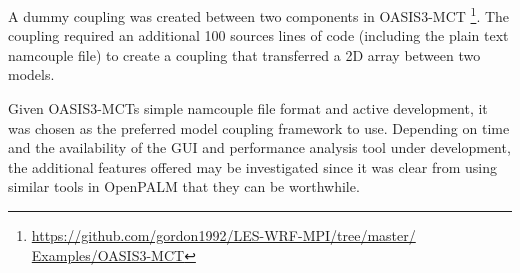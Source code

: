 A dummy coupling was created between two components in OASIS3-MCT
\footnote{\url{https://github.com/gordon1992/LES-WRF-MPI/tree/master/
Examples/OASIS3-MCT}}. The coupling required an additional 100 sources lines of
code (including the plain text namcouple file) to create a coupling that
transferred a 2D array between two models.

Given OASIS3-MCTs simple namcouple file format and active development, it was
chosen as the preferred model coupling framework to use. Depending on time and
the availability of the GUI and performance analysis tool under development, the
additional features offered may be investigated since it was clear from using
similar tools in OpenPALM that they can be worthwhile.
